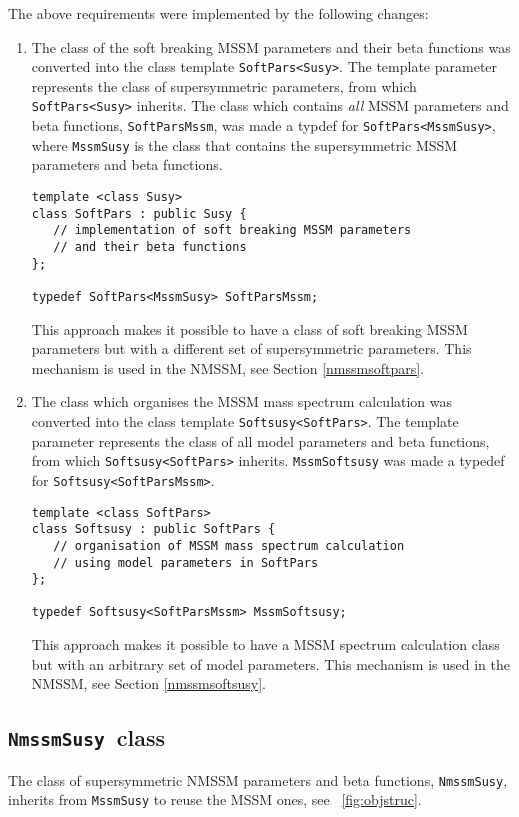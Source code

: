 \documentclass[final,3p,times,pdflatex]{elsarticle}
\def\code#1{\small{\tt #1}\normalsize}
\begin{document}
The above requirements were implemented by the following changes:
%
\begin{enumerate}
\item The class of the soft breaking MSSM parameters and their beta
  functions was converted into the class template \code{SoftPars<Susy>}.
  The template parameter represents the class of supersymmetric
  parameters, from which \code{SoftPars<Susy>} inherits.  The class
  which contains \emph{all} MSSM parameters and beta functions,
  \code{SoftParsMssm}, was made a typdef for
  \code{SoftPars<MssmSusy>}, where \code{MssmSusy} is the class that
  contains the supersymmetric MSSM parameters and beta functions.
\begin{verbatim}
template <class Susy>
class SoftPars : public Susy {
   // implementation of soft breaking MSSM parameters
   // and their beta functions
};

typedef SoftPars<MssmSusy> SoftParsMssm;
\end{verbatim}
  This approach makes it possible to have a class of soft breaking
  MSSM parameters but with a different set of supersymmetric
  parameters.  This mechanism is used in the NMSSM, see Section
  \ref{nmssmsoftpars}.

\item The class which organises the MSSM mass spectrum calculation was
  converted into the class template \code{Softsusy<SoftPars>}.  The
  template parameter represents the class of all model parameters and
  beta functions, from which \code{Softsusy<SoftPars>} inherits.
  \code{MssmSoftsusy} was made a typedef for
  \code{Softsusy<SoftParsMssm>}.
\begin{verbatim}
template <class SoftPars>
class Softsusy : public SoftPars {
   // organisation of MSSM mass spectrum calculation
   // using model parameters in SoftPars
};

typedef Softsusy<SoftParsMssm> MssmSoftsusy;
\end{verbatim}
  This approach makes it possible to have a MSSM spectrum calculation
  class but with an arbitrary set of model parameters.  This mechanism
  is used in the NMSSM, see Section \ref{nmssmsoftsusy}.
\end{enumerate}

\subsection{\code{NmssmSusy}~class}
\label{nmssmsusy}

The class of supersymmetric NMSSM parameters and beta functions,
\code{NmssmSusy}, inherits from \code{MssmSusy} to reuse the MSSM
ones, see \figurename~\ref{fig:objstruc}.
\end{document}
